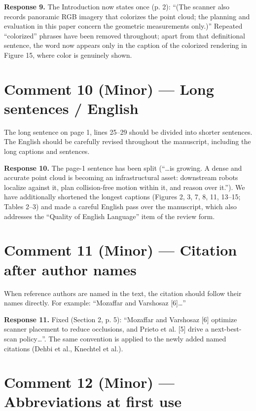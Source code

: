 \textbf{Response 9.} The Introduction now states once (p. 2): “(The scanner also records panoramic RGB imagery that colorizes the point cloud; the planning and evaluation in this paper concern the geometric measurements only.)” Repeated “colorized” phrases have been removed throughout; apart from that definitional sentence, the word now appears only in the caption of the colorized rendering in Figure 15, where color is genuinely shown.

\section*{Comment 10 (Minor) — Long sentences / English}

\begin{quoting}
The long sentence on page 1, lines 25–29 should be divided into shorter sentences. The English should be carefully revised throughout the manuscript, including the long captions and sentences.
\end{quoting}

\textbf{Response 10.} The page-1 sentence has been split (“…is growing. A dense and accurate point cloud is becoming an infrastructural asset: downstream robots localize against it, plan collision-free motion within it, and reason over it.”). We have additionally shortened the longest captions (Figures 2, 3, 7, 8, 11, 13–15; Tables 2–3) and made a careful English pass over the manuscript, which also addresses the “Quality of English Language” item of the review form.

\section*{Comment 11 (Minor) — Citation after author names}

\begin{quoting}
When reference authors are named in the text, the citation should follow their names directly. For example: “Mozaffar and Varshosaz [6]…”
\end{quoting}

\textbf{Response 11.} Fixed (Section 2, p. 5): “Mozaffar and Varshosaz [6] optimize scanner placement to reduce occlusions, and Prieto et al. [5] drive a next-best-scan policy…”. The same convention is applied to the newly added named citations (Dehbi et al., Knechtel et al.).

\section*{Comment 12 (Minor) — Abbreviations at first use}

